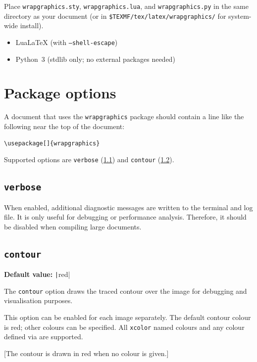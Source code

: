 \documentclass{article}
\begin{document}
Place \texttt{wrapgraphics.sty}, \texttt{wrapgraphics.lua}, and \texttt{wrapgraphics.py} in the same directory as your document (or in \texttt{\$TEXMF/tex/latex/wrapgraphics/} for system-wide install).

\begin{itemize}
  \item Lua\LaTeX{} (with \texttt{--shell-escape})
  \item Python~3 (stdlib only; no external packages needed)
\end{itemize}

\section{Package options}

A document that uses the \texttt{wrapgraphics} package should contain a line like the following near the top of the document:

\begin{verbatim}
\usepackage[]{wrapgraphics}
\end{verbatim}

Supported options are \texttt{verbose} (\ref{package:verbose}) and \texttt{contour} (\ref{package:contour}).

\subsection{\texttt{verbose}}\label{package:verbose}

When enabled, additional diagnostic messages are written to the terminal and log file. It is only useful for debugging or performance analysis. Therefore, it should be disabled when compiling large documents.

\subsection{\texttt{contour}}\label{package:contour}

\textbf{Default value:} \texttt|red|

The \texttt{contour} option draws the traced contour over the image for debugging and visualisation purposes.

This option can be enabled for each image separately. The default contour colour is red; other colours can be specified. All \texttt{xcolor} named colours and any colour defined via \texttt{\string\definecolor} are supported.

[The contour is drawn in red when no colour is given.]
\end{document}
